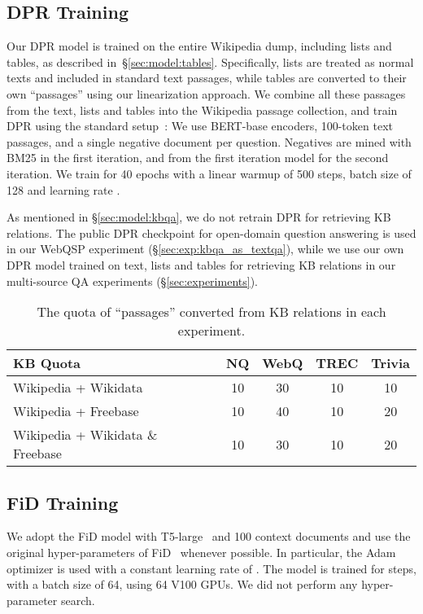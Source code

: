 \documentclass[11pt]{article}
\newcommand{\secref}[1]{\S\ref{#1}}
\begin{document}
\subsection{DPR Training}\label{sec:implementation:dpr}
Our DPR model is trained on the entire Wikipedia dump, including lists and tables, as described in~\secref{sec:model:tables}.
Specifically, lists are treated as normal texts and included in standard text passages, while tables are converted to their own ``passages'' using our linearization approach.
We combine all these passages from the text, lists and tables into the Wikipedia passage collection, and train DPR using the standard setup~\cite{DPR}: We use BERT-base \citep{BERT} encoders, 100-token text passages, and a single negative document per question.  Negatives are mined with BM25 in the first iteration, and from the first iteration model for the second iteration.  We train for 40 epochs with a linear warmup of 500 steps, batch size of 128 and learning rate .

As mentioned in \secref{sec:model:kbqa}, we do not retrain DPR for retrieving KB relations.
The public DPR checkpoint for open-domain question answering is used in our WebQSP experiment (\secref{sec:exp:kbqa_as_textqa}), while we use our own DPR model trained on text, lists and tables for retrieving KB relations in our multi-source QA experiments (\secref{sec:experiments}).

\begin{table*}[ht]
    \centering
    \begin{tabular}{l c c c c c}
    \toprule
    KB Quota && NQ & WebQ & TREC & Trivia \\
    \midrule
    Wikipedia + Wikidata && 10 & 30 & 10 & 10 \\
    Wikipedia + Freebase && 10 & 40 & 10 & 20 \\
    Wikipedia + Wikidata \& Freebase && 10 & 30 & 10 & 20 \\
    \bottomrule
    \end{tabular}
    \caption{The quota of ``passages'' converted from KB relations in each experiment.}
    \label{tab:kb_quota}
\end{table*} 
\subsection{FiD Training}\label{sec:implementation:fid}
We adopt the FiD model with T5-large~\cite{t5} and 100 context documents and use the original hyper-parameters of FiD~\cite{izacard-grave-2021-leveraging} whenever possible.
In particular, the Adam~\cite{kingma2014adam} optimizer is used with a constant learning rate of .
The model is trained for  steps, with a batch size of 64, using 64 V100 GPUs.
We did not perform any hyper-parameter search.
\end{document}
